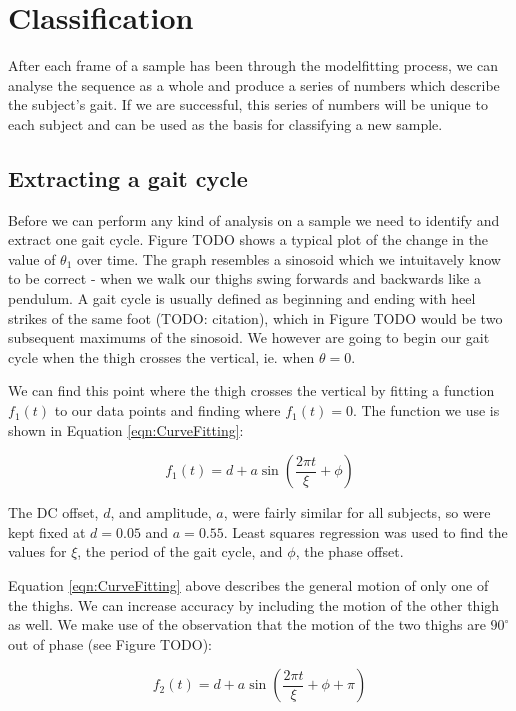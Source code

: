 \section{Classification}

After each frame of a sample has been through the modelfitting process, we can analyse the sequence as a whole
and produce a series of numbers which describe the subject's gait.
If we are successful, this series of numbers will be unique to each subject and can be used as the basis for classifying a new sample.


\subsection{Extracting a gait cycle}

Before we can perform any kind of analysis on a sample we need to identify and extract one gait cycle.
Figure TODO shows a typical plot of the change in the value of $\theta_1$ over time.
The graph resembles a sinosoid which we intuitavely know to be correct - when we walk our thighs swing forwards and backwards like a pendulum.
A gait cycle is usually defined as beginning and ending with heel strikes of the same foot (TODO: citation), which in Figure TODO would be two subsequent maximums of the sinosoid.
We however are going to begin our gait cycle when the thigh crosses the vertical, ie. when $\theta = 0$.

We can find this point where the thigh crosses the vertical by fitting a function $f_1(t)$ to our data points and finding where $f_1(t) = 0$.
The function we use is shown in Equation \ref{eqn:CurveFitting}:

\begin{equation}
	f_1(t) = d + a \sin(\frac{2 \pi t}{\xi} + \phi)
	\label{eqn:CurveFitting}
\end{equation}

The DC offset, $d$, and amplitude, $a$, were fairly similar for all subjects, so were kept fixed at $d = 0.05$ and $a = 0.55$.
Least squares regression was used to find the values for $\xi$, the period of the gait cycle, and $\phi$, the phase offset.

Equation \ref{eqn:CurveFitting} above describes the general motion of only one of the thighs.
We can increase accuracy by including the motion of the other thigh as well.
We make use of the observation that the motion of the two thighs are $90^\circ$ out of phase (see Figure TODO):

\begin{equation}
	f_2(t) = d + a \sin(\frac{2 \pi t}{\xi} + \phi + \pi)
	\label{eqn:CurveFitting2}
\end{equation}

